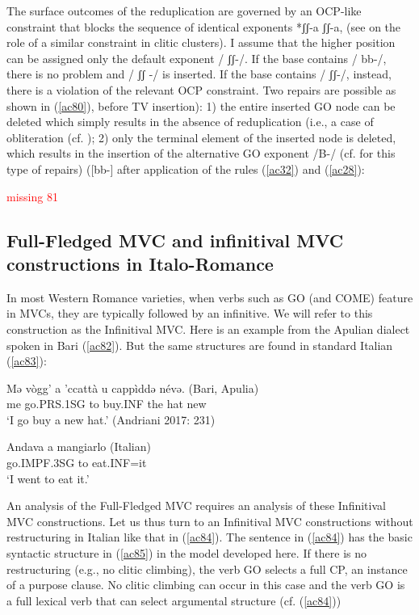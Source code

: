 \documentclass[output=paper]{langscibook}
\begin{document}
The surface outcomes of the reduplication are governed by an OCP-like constraint that blocks the sequence of identical exponents *ʃʃ-a ʃʃ-a, (see \cite{pescarini2010a} on the role of a similar constraint in clitic clusters).  I assume that the higher position can be assigned only the default exponent / ʃʃ-/. If the base contains / bb-/, there is no problem and / ʃʃ -/ is inserted.  If the base contains / ʃʃ-/, instead, there is a violation of the relevant OCP constraint.  Two repairs are possible as shown in (\ref{ac80}), before TV insertion): 1) the entire inserted GO node can be deleted which simply results in the absence of reduplication (i.e., a case of obliteration (cf. \cite{arregi2012a}); 2) only the terminal element of the inserted node is deleted, which results in the insertion of the alternative GO exponent /B-/ (cf. \cite{pescarini2010a} for this type of repairs) ([bb-] after application of the rules (\ref{ac32}) and (\ref{ac28}):


\ea
\textcolor{red}{missing 81}
\z

\subsection{Full-Fledged MVC and infinitival MVC constructions in Italo-Romance}

In most Western Romance varieties, when verbs such as GO (and COME) feature in MVCs, they are typically followed by an infinitive. We will refer to this construction as the Infinitival MVC. Here is an example from the Apulian dialect spoken in Bari (\ref{ac82}).  But the same structures are found in standard Italian (\ref{ac83}): 

\ea \label{ac82}\gll Mə  vògg’    a  ’ccattà  u  cappìddə  névə.   \hfill (Bari, Apulia)\\
   me  go.PRS.1SG to  buy.INF  the  hat    new {}\\
   \glt ‘I go buy a new hat.’ \hfill (Andriani 2017: 231)
\z

\ea \label{ac83}\gll Andava      a     mangiarlo      \hfill (Italian)\\
     go.IMPF.3SG   to    eat.INF=it {}\\
    \glt ‘I went to eat it.’ 
\z

An analysis of the Full-Fledged MVC requires an analysis of these Infinitival MVC constructions. Let us thus turn to an Infinitival MVC constructions without restructuring in Italian like that in (\ref{ac84}).  The sentence in (\ref{ac84}) has the basic syntactic structure in (\ref{ac85}) in the model developed here.  If there is no restructuring (e.g., no clitic climbing), the verb GO selects a full CP, an instance of a purpose clause. No clitic climbing can occur in this case and the verb GO is a full lexical verb that can select argumental structure (cf. (\ref{ac84}))
\end{document}
